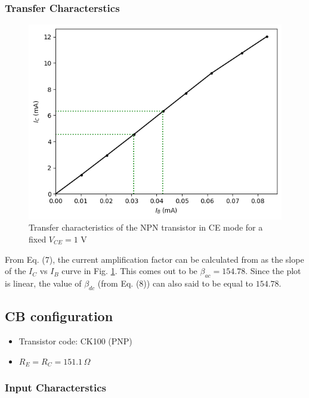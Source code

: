     \subsubsection*{\textbf{Transfer Characterstics}} 

    \begin{figure}[H]
        \centering
        \includegraphics[width=1\columnwidth]{images/g3.png}
        \caption{Transfer characteristics of the NPN transistor in CE mode for a fixed $V_{CE}=1$ V}
        \label{graph:3}
    \end{figure}

    From Eq. (7), the current amplification factor can be calculated from as the slope of the $I_C$ vs $I_B$ curve in  Fig. \ref{graph:3}. This comes out to be $\beta_{ac}=154.78$. Since the plot is linear, the value of $\beta_{dc}$ (from Eq. (8)) can also said to be equal to $154.78$.

\subsection{CB configuration}

\begin{itemize}
    \item Transistor code: CK100 (PNP)
    \item $R_E = R_C = 151.1\,\Omega$
\end{itemize}

    \subsubsection*{\textbf{Input Characterstics}} 

